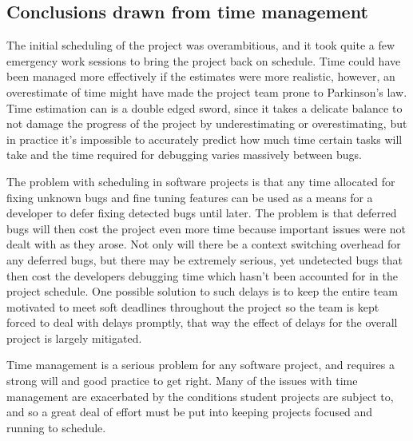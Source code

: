 \subsection{Conclusions drawn from time management}
The initial scheduling of the project was overambitious, and it took quite a few emergency work sessions to bring the project back on schedule. Time could have been managed more effectively if the estimates were more realistic, however, an overestimate of time might have made the project team prone to Parkinson's law.\cite{bryan1967parkinson} Time estimation can is a double edged sword, since it takes a delicate balance to not damage the progress of the project by underestimating or overestimating, but in practice it's impossible to accurately predict how much time certain tasks will take and the time required for debugging varies massively between bugs. 

The problem with scheduling in software projects is that any time allocated for fixing unknown bugs and fine tuning features can be used as a means for a developer to defer fixing detected bugs until later. The problem is that deferred bugs will then cost the project even more time because important issues were not dealt with as they arose. Not only will there be a context switching overhead for any deferred bugs, but there may be extremely serious, yet undetected bugs that then cost the developers debugging time which hasn't been accounted for in the project schedule.\cite{bryan1967parkinson} One possible solution to such delays is to keep the entire team motivated to meet soft deadlines throughout the project so the team is kept forced to deal with delays promptly, that way the effect of delays for the overall project is largely mitigated. 

Time management is a serious problem for any software project, and requires a strong will and good practice to get right. Many of the issues with time management are exacerbated by the conditions student projects are subject to, and so a great deal of effort must be put into keeping projects focused and running to schedule.
